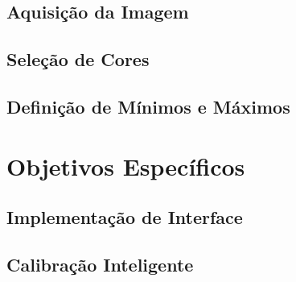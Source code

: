 \subsection{Aquisição da Imagem}
%
\subsection{Seleção de Cores}
\subsection{Definição de Mínimos e Máximos}


\section{Objetivos Específicos} 
\subsection{Implementação de Interface}
\subsection{Calibração Inteligente}
\newpage

	


